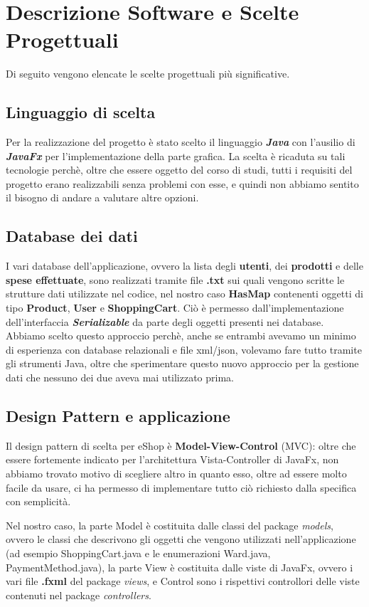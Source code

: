 \documentclass[12pt]{article}
\begin{document}
\section{Descrizione Software e Scelte Progettuali}
Di seguito vengono elencate le scelte progettuali più significative.

\subsection{Linguaggio di scelta}
Per la realizzazione del progetto è stato scelto il linguaggio \textbf{\emph{Java}} con l'ausilio di \textbf{\emph{JavaFx}} per l'implementazione della parte grafica. La scelta è ricaduta su tali tecnologie perchè, oltre che essere oggetto del corso di studi, tutti i requisiti del progetto erano realizzabili senza problemi con esse, e quindi non abbiamo sentito il bisogno di andare a valutare altre opzioni.

\subsection{Database dei dati}
I vari database dell'applicazione, ovvero la lista degli \textbf{utenti}, dei \textbf{prodotti} e delle \textbf{spese effettuate}, sono realizzati tramite file \textbf{.txt} sui quali vengono scritte le strutture dati utilizzate nel codice, nel nostro caso \textbf{HasMap} contenenti oggetti di tipo \textbf{Product}, \textbf{User} e \textbf{ShoppingCart}. Ciò è permesso dall'implementazione dell'interfaccia \textbf{\emph{Serializable}} da parte degli oggetti presenti nei database.
Abbiamo scelto questo approccio perchè, anche se entrambi avevamo un minimo di esperienza con database relazionali e file xml/json, volevamo fare tutto tramite gli strumenti Java, oltre che sperimentare questo nuovo approccio per la gestione dati che nessuno dei due aveva mai utilizzato prima.

\subsection{Design Pattern e applicazione}
Il design pattern di scelta per eShop è \textbf{Model-View-Control} (MVC): oltre che essere fortemente indicato per l'architettura Vista-Controller di JavaFx, non abbiamo trovato motivo di scegliere altro in quanto esso, oltre ad essere molto facile da usare, ci ha permesso di implementare tutto ciò richiesto dalla specifica con semplicità.

Nel nostro caso, la parte Model è costituita dalle classi del package \emph{models}, ovvero le classi che descrivono gli oggetti che vengono utilizzati nell'applicazione (ad esempio ShoppingCart.java e le enumerazioni Ward.java, PaymentMethod.java), la parte View è costituita dalle viste di JavaFx, ovvero i vari file \textbf{.fxml} del package \emph{views}, e Control sono i rispettivi controllori delle viste contenuti nel package \emph{controllers}.
\end{document}
